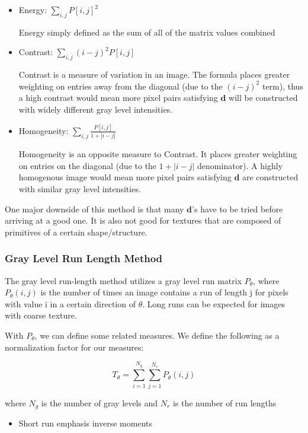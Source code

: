 \documentclass{article}
\begin{document}
\begin{multicols}{2}
\begin{itemize}
\item Energy:  $\sum_{i,j} P[i,j]^2$

Energy simply defined as the sum of all of the matrix values combined

\item Contrast: $\sum_{i,j} (i-j)^2 P[i,j]$

Contrast is a measure of variation in an image. The formula places greater weighting on entries away from the diagonal (due to the $(i-j)^2$ term), thus a high contrast would mean more pixel pairs satisfying $\mathbf{d}$ will be constructed with widely different gray level intensities.

\item Homogeneity: $\sum_{i,j} \frac{P[i,j]}{ 1 + | i-j |}$

Homogeneity is an opposite measure to Contrast. It places greater weighting on entries on the diagonal (due to the $1 + |i - j|$ denominator). A highly homogenous image would mean more pixel pairs satisfying $\mathbf{d}$ are constructed with similar gray level intensities.

\end{itemize}

One major downside of this method is that many $\mathbf{d}$'s have to be tried before arriving at a good one. It is also not good for textures that are composed of primitives of a certain shape/structure.

\subsubsection{Gray Level Run Length Method}

The gray level run-length method utilizes a gray level run matrix $P_\theta$, where $P_\theta(i,j)$ is the number of times an image contains a run of length j for pixels with value i in a certain direction of $\theta$. Long runs can be expected for images with coarse texture.

With $P_\theta$, we can define some related measures. We define the following as a normalization factor for our measures:

$$
T_\theta = \sum_{i=1} ^{N_g} \sum_{j=1} ^{N_r} P_\theta(i,j)
$$

where $N_g$ is the number of gray levels and $N_r$ is the number of run lengths

\begin{itemize}
\item {Short run emphasis inverse moments}


\end{itemize}
\end{multicols}
\end{document}
